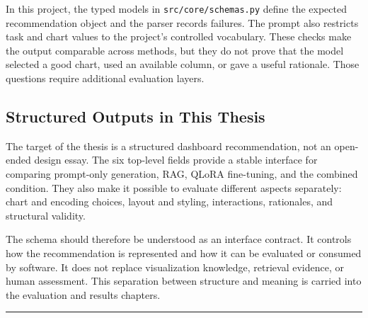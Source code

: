 In this project, the typed models in \texttt{src/core/schemas.py} define the expected recommendation object and the parser records failures. The prompt also restricts task and chart values to the project's controlled vocabulary. These checks make the output comparable across methods, but they do not prove that the model selected a good chart, used an available column, or gave a useful rationale. Those questions require additional evaluation layers.

\subsection{Structured Outputs in This Thesis}

The target of the thesis is a structured dashboard recommendation, not an open-ended design essay. The six top-level fields provide a stable interface for comparing prompt-only generation, RAG, QLoRA fine-tuning, and the combined condition. They also make it possible to evaluate different aspects separately: chart and encoding choices, layout and styling, interactions, rationales, and structural validity.

The schema should therefore be understood as an interface contract. It controls how the recommendation is represented and how it can be evaluated or consumed by software. It does not replace visualization knowledge, retrieval evidence, or human assessment. This separation between structure and meaning is carried into the evaluation and results chapters.

\begin{center}\rule{0.5\linewidth}{0.5pt}\end{center}
